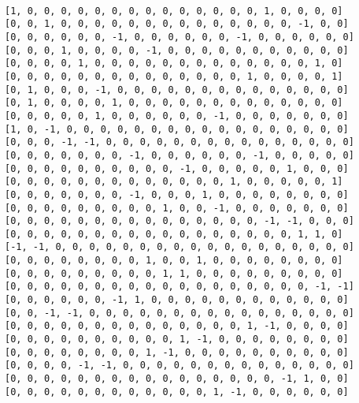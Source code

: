\documentclass[12pt,a4paper]{article}
\theoremstyle{definition}
\begin{document}
\begin{lstlisting}[language=iPython]
 
[1, 0, 0, 0, 0, 0, 0, 0, 0, 0, 0, 0, 0, 0, 0, 1, 0, 0, 0, 0]
[0, 0, 1, 0, 0, 0, 0, 0, 0, 0, 0, 0, 0, 0, 0, 0, 0, -1, 0, 0]
[0, 0, 0, 0, 0, 0, -1, 0, 0, 0, 0, 0, 0, -1, 0, 0, 0, 0, 0, 0]
[0, 0, 0, 1, 0, 0, 0, 0, -1, 0, 0, 0, 0, 0, 0, 0, 0, 0, 0, 0]
[0, 0, 0, 0, 1, 0, 0, 0, 0, 0, 0, 0, 0, 0, 0, 0, 0, 0, 1, 0]
[0, 0, 0, 0, 0, 0, 0, 0, 0, 0, 0, 0, 0, 0, 1, 0, 0, 0, 0, 1]
[0, 1, 0, 0, 0, -1, 0, 0, 0, 0, 0, 0, 0, 0, 0, 0, 0, 0, 0, 0]
[0, 1, 0, 0, 0, 0, 1, 0, 0, 0, 0, 0, 0, 0, 0, 0, 0, 0, 0, 0]
[0, 0, 0, 0, 0, 1, 0, 0, 0, 0, 0, 0, -1, 0, 0, 0, 0, 0, 0, 0]
[1, 0, -1, 0, 0, 0, 0, 0, 0, 0, 0, 0, 0, 0, 0, 0, 0, 0, 0, 0]
[0, 0, 0, -1, -1, 0, 0, 0, 0, 0, 0, 0, 0, 0, 0, 0, 0, 0, 0, 0]
[0, 0, 0, 0, 0, 0, 0, -1, 0, 0, 0, 0, 0, 0, -1, 0, 0, 0, 0, 0]
[0, 0, 0, 0, 0, 0, 0, 0, 0, 0, -1, 0, 0, 0, 0, 0, 1, 0, 0, 0]
[0, 0, 0, 0, 0, 0, 0, 0, 0, 0, 0, 0, 0, 1, 0, 0, 0, 0, 0, 1]
[0, 0, 0, 0, 0, 0, 0, -1, 0, 0, 0, 1, 0, 0, 0, 0, 0, 0, 0, 0]
[0, 0, 0, 0, 0, 0, 0, 0, 0, 1, 0, 0, -1, 0, 0, 0, 0, 0, 0, 0]
[0, 0, 0, 0, 0, 0, 0, 0, 0, 0, 0, 0, 0, 0, 0, -1, -1, 0, 0, 0]
[0, 0, 0, 0, 0, 0, 0, 0, 0, 0, 0, 0, 0, 0, 0, 0, 0, 1, 1, 0]
[-1, -1, 0, 0, 0, 0, 0, 0, 0, 0, 0, 0, 0, 0, 0, 0, 0, 0, 0, 0]
[0, 0, 0, 0, 0, 0, 0, 0, 1, 0, 0, 1, 0, 0, 0, 0, 0, 0, 0, 0]
[0, 0, 0, 0, 0, 0, 0, 0, 0, 1, 1, 0, 0, 0, 0, 0, 0, 0, 0, 0]
[0, 0, 0, 0, 0, 0, 0, 0, 0, 0, 0, 0, 0, 0, 0, 0, 0, 0, -1, -1]
[0, 0, 0, 0, 0, 0, -1, 1, 0, 0, 0, 0, 0, 0, 0, 0, 0, 0, 0, 0]
[0, 0, -1, -1, 0, 0, 0, 0, 0, 0, 0, 0, 0, 0, 0, 0, 0, 0, 0, 0]
[0, 0, 0, 0, 0, 0, 0, 0, 0, 0, 0, 0, 0, 0, 1, -1, 0, 0, 0, 0]
[0, 0, 0, 0, 0, 0, 0, 0, 0, 0, 1, -1, 0, 0, 0, 0, 0, 0, 0, 0]
[0, 0, 0, 0, 0, 0, 0, 0, 1, -1, 0, 0, 0, 0, 0, 0, 0, 0, 0, 0]
[0, 0, 0, 0, -1, -1, 0, 0, 0, 0, 0, 0, 0, 0, 0, 0, 0, 0, 0, 0]
[0, 0, 0, 0, 0, 0, 0, 0, 0, 0, 0, 0, 0, 0, 0, 0, -1, 1, 0, 0]
[0, 0, 0, 0, 0, 0, 0, 0, 0, 0, 0, 0, 1, -1, 0, 0, 0, 0, 0, 0]




\end{lstlisting}
\end{document}
